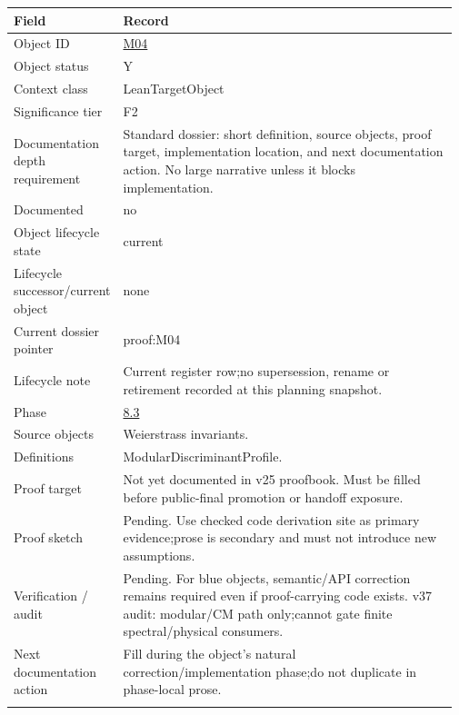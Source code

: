 \begin{longtable}{L{0.16\linewidth} L{0.81\linewidth}}
\hline
\textbf{Field} & \textbf{Record}\\
\hline
Object ID & \hyperlink{object-row-M04}{M04}\\
\hline\addlinespace[0.20em]
Object status & Y\\
\hline\addlinespace[0.20em]
Context class & LeanTargetObject\\
\hline\addlinespace[0.20em]
Significance tier & F2\\
\hline\addlinespace[0.20em]
Documentation depth requirement & Standard dossier: short definition, source objects, proof target, implementation location, and next documentation action. No large narrative unless it blocks implementation.\\
\hline\addlinespace[0.20em]
Documented & no\\
\hline\addlinespace[0.20em]
Object lifecycle state & current\\
\hline\addlinespace[0.20em]
Lifecycle successor/\allowbreak{}current object & none\\
\hline\addlinespace[0.20em]
Current dossier pointer & proof:M04\\
\hline\addlinespace[0.20em]
Lifecycle note & Current register row;\newline no supersession, rename or retirement recorded at this planning snapshot.\\
\hline\addlinespace[0.20em]
Phase & \hyperlink{phase-row-8-3}{8.3}\\
\hline\addlinespace[0.20em]
Source objects & Weierstrass invariants.\\
\hline\addlinespace[0.20em]
Definitions & ModularDiscriminantProfile.\\
\hline\addlinespace[0.20em]
Proof target & Not yet documented in v25 proofbook. Must be filled before public-final promotion or handoff exposure.\\
\hline\addlinespace[0.20em]
Proof sketch & Pending. Use checked code derivation site as primary evidence;\newline prose is secondary and must not introduce new assumptions.\\
\hline\addlinespace[0.20em]
Verification /\allowbreak{} audit & Pending. For blue objects, semantic/\allowbreak{}API correction remains required even if proof-carrying code exists. v37 audit: modular/\allowbreak{}CM path only;\newline cannot gate finite spectral/\allowbreak{}physical consumers.\\
\hline\addlinespace[0.20em]
Next documentation action & Fill during the object's natural correction/\allowbreak{}implementation phase;\newline do not duplicate in phase-local prose.\\
\hline\addlinespace[0.20em]
\end{longtable}
